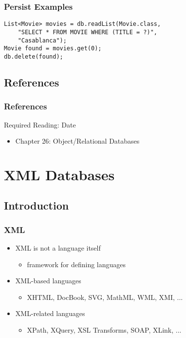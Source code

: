 \documentclass[dvipsnames]{beamer}
\theoremstyle{plain}
\begin{document}
\begin{frame}[fragile]
  \frametitle{Persist Examples}

  \begin{example}[delete]
    \begin{lstlisting}
List<Movie> movies = db.readList(Movie.class,
    "SELECT * FROM MOVIE WHERE (TITLE = ?)",
    "Casablanca");
Movie found = movies.get(0);
db.delete(found);
    \end{lstlisting}
  \end{example}
\end{frame}

\subsection*{References}

\begin{frame}
  \frametitle{References}

  \begin{block}{Required Reading: Date}
    \begin{itemize}
      \item Chapter 26: \alert{Object/Relational Databases}
    \end{itemize}
  \end{block}
\end{frame}


\section{XML Databases}

\subsection{Introduction}

\begin{frame}
  \frametitle{XML}

  \begin{itemize}
    \item XML is not a language itself
    \begin{itemize}
      \item framework for defining languages
    \end{itemize}

    \pause
    \item XML-based languages
    \begin{itemize}
      \item XHTML, DocBook, SVG, MathML, WML, XMI, ...
    \end{itemize}

    \pause
    \item XML-related languages
    \begin{itemize}
      \item XPath, XQuery, XSL Transforms, SOAP, XLink, ...
    \end{itemize}
  \end{itemize}
\end{frame}
\end{document}
